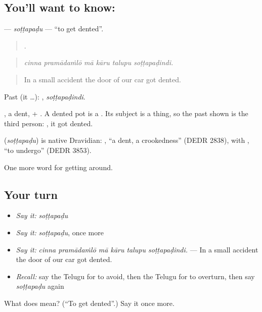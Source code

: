 \subsection*{You'll want to know: }
\textbf{} — \emph{soṭṭapaḍu} — \textquotedblleft{}to get dented\textquotedblright{}.

\begin{quote}
     .
\end{quote}

\begin{quote}
\emph{cinna pramādaṁlō mā kāru talupu soṭṭapaḍindi.}
\end{quote}

\begin{quote}
In a small accident the door of our car got dented.
\end{quote}

Past (it …): , \emph{soṭṭapaḍindi}.

, a dent, + . A dented pot is a  . Its subject is a thing, so the past shown is the third person: , it got dented.

\begin{cousinweb}
\textbf{} (\emph{soṭṭapaḍu}) is native Dravidian: , \textquotedblleft{}a dent, a crookedness\textquotedblright{} (DEDR 2838), with , \textquotedblleft{}to undergo\textquotedblright{} (DEDR 3853).
\end{cousinweb}

\begin{grammarlens}[title={What you've built}]
One more word for getting around.
\end{grammarlens}

\subsection*{Your turn}
\begin{itemize}
\raggedright
  \item \emph{Say it:} \emph{soṭṭapaḍu}
  \item \emph{Say it:} \emph{soṭṭapaḍu}, once more
  \item \emph{Say it:} \emph{cinna pramādaṁlō mā kāru talupu soṭṭapaḍindi.} — In a small accident the door of our car got dented.
  \item \emph{Recall:} say the Telugu for to avoid, then the Telugu for to overturn, then say \emph{soṭṭapaḍu} again
\end{itemize}

\begin{tcolorbox}[breakable,colback=teal!4,colframe=teal!35!black,title={Before you move on}]
What does  mean? (\textquotedblleft{}To get dented\textquotedblright{}.) Say it once more.
\end{tcolorbox}
